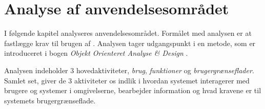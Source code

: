 \chapter{Analyse af anvendelsesområdet}
\label{chap:analyseafao}

I følgende kapitel analyseres anvendelsesområdet. Formålet med analysen er at fastlægge krav til brugen af \Foodl{}. Analysen tager udgangspunkt i en metode, som er introduceret i bogen \emph{Objekt Orienteret Analyse \& Design} \cite[p. ~113]{ooad}. 

Analysen indeholder 3 hovedaktiviteter, \textit{brug}, \textit{funktioner} og \textit{brugergrænseflader}. Samlet set, giver de 3 aktiviteter os indlik i hvordan systemet interagerer med brugere og systemer i omgivelserne, bearbejder information og hvad kravene er til systemets brugergrænseflade\cite[p. ~115]{ooad}.




